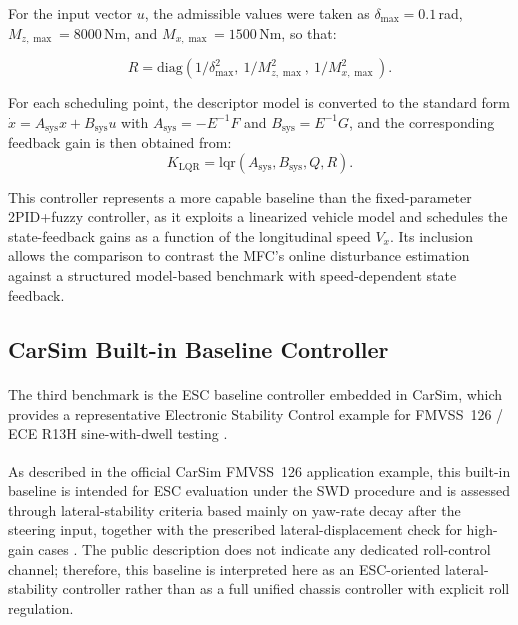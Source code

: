 \documentclass[sn-chicago,iicol]{sn-jnl}
\theoremstyle{thmstyleone}%
\theoremstyle{thmstyletwo}%
\theoremstyle{thmstylethree}%
\begin{document}
For the input vector 
$u$, the admissible values were taken as 
$\delta_{\max}=0.1$\,rad, $M_{z,\max}=8000$\,Nm, and 
$M_{x,\max}=1500$\,Nm, so that:

\begin{equation*}
    R=\mathrm{diag}(1/\delta_{\max}^2,\ 1/M_{z,\max}^2,\ 
1/M_{x,\max}^2).
\end{equation*}

 For each scheduling point, the 
descriptor model is converted to the standard form 
$\dot{x}=A_{\mathrm{sys}}x+B_{\mathrm{sys}}u$ with 
$A_{\mathrm{sys}}=-E^{-1}F$ and $B_{\mathrm{sys}}=E^{-1}G$, and the 
corresponding feedback gain is then obtained from:
\begin{equation*}
     K_{\mathrm{LQR}}=\mathrm{lqr}(A_{\mathrm{sys}},B_{\mathrm{sys}},Q,R).  
\end{equation*} 

 
This controller represents a more capable baseline than the fixed-parameter 
2PID+fuzzy controller, as it exploits a linearized vehicle model and 
schedules the state-feedback gains as a function of the longitudinal speed 
$V_x$. Its inclusion allows the comparison to contrast the MFC's online 
disturbance estimation against a structured model-based benchmark with 
speed-dependent state feedback.


\subsection{CarSim Built-in Baseline Controller}\label{sec:carsim_base}

The third benchmark is the ESC baseline controller embedded in 
CarSim\textsuperscript{\textregistered}, which provides a representative 
Electronic Stability Control example for FMVSS~126 / ECE R13H 
sine-with-dwell testing 
\citep{carsim_fmvss126}.

As described in the official CarSim\textsuperscript{\textregistered} FMVSS~126 application example, this 
built-in baseline is intended for ESC evaluation under the SWD 
procedure and is assessed through lateral-stability criteria based mainly 
on yaw-rate decay after the steering input, together with the prescribed 
lateral-displacement check for high-gain cases \citep{carsim_fmvss126}. 
The public description does not indicate any dedicated roll-control 
channel; therefore, this baseline is interpreted here as an ESC-oriented 
lateral-stability controller rather than as a full unified chassis 
controller with explicit roll regulation.
\end{document}
